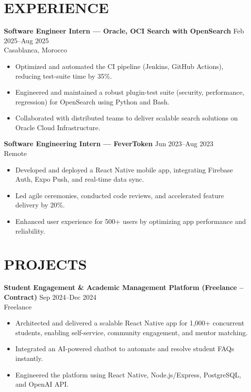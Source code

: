 \documentclass[10pt,a4paper]{article}
\begin{document}
\section{EXPERIENCE}

	\textbf{Software Engineer Intern — Oracle, OCI Search with OpenSearch}
\hfill Feb 2025--Aug 2025\\
Casablanca, Morocco
\begin{itemize}[leftmargin=*]
    \item Optimized and automated the CI pipeline (Jenkins, GitHub Actions), reducing test-suite time by 35\%.
    \item Engineered and maintained a robust plugin-test suite (security, performance, regression) for OpenSearch using Python and Bash.
    \item Collaborated with distributed teams to deliver scalable search solutions on Oracle Cloud Infrastructure.
\end{itemize}

	\textbf{Software Engineering Intern — FeverToken}
\hfill Jun 2023--Aug 2023\\
Remote
\begin{itemize}[leftmargin=*]
    \item Developed and deployed a React Native mobile app, integrating Firebase Auth, Expo Push, and real-time data sync.
    \item Led agile ceremonies, conducted code reviews, and accelerated feature delivery by 20\%.
    \item Enhanced user experience for 500+ users by optimizing app performance and reliability.
\end{itemize}

\section{PROJECTS}

	\textbf{Student Engagement \& Academic Management Platform (Freelance -- Contract)}
\hfill Sep 2024--Dec 2024 \\
Freelance
\begin{itemize}[leftmargin=*]
    \item Architected and delivered a scalable React Native app for 1,000+ concurrent students, enabling self-service, community engagement, and mentor matching.
    \item Integrated an AI-powered chatbot to automate and resolve student FAQs instantly.
    \item Engineered the platform using React Native, Node.js/Express, PostgreSQL, and OpenAI API.
\end{itemize}
\end{document}
